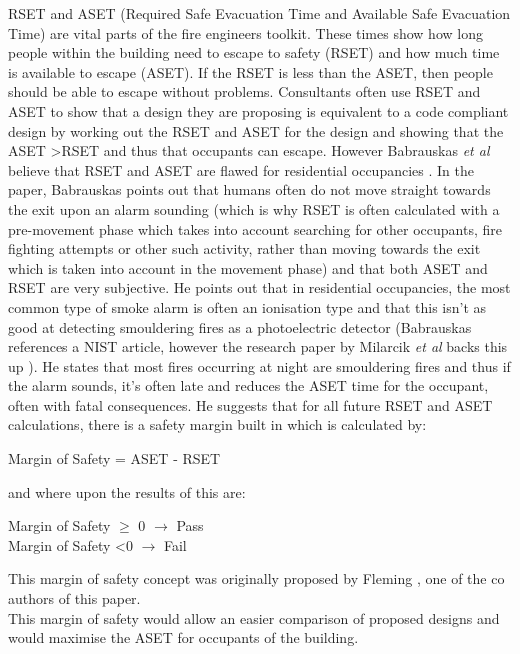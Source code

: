 \documentclass[table,a4paper,oneside]{book}
\begin{document}
RSET and ASET (Required Safe Evacuation Time and Available Safe Evacuation Time) are vital parts of the fire engineers toolkit. These times show how long people within the building need to escape to safety (RSET) and how much time is available to escape (ASET). If the RSET is less than the ASET, then people should be able to escape without problems. Consultants often use RSET and ASET to show that a design they are proposing is equivalent to a code compliant design by working out the RSET and ASET for the design and showing that the ASET \textgreater RSET and thus that occupants can escape. However Babrauskas \textit{et al} believe that RSET and ASET are flawed for residential occupancies \citep{Babrauskas2010}. In the paper, Babrauskas points out that humans often do not move straight towards the exit upon an alarm sounding (which is why RSET is often calculated with a pre-movement phase which takes into account searching for other occupants, fire fighting attempts or other such activity, rather than moving towards the exit which is taken into account in the movement phase) and that both ASET and RSET are very subjective. He points out that in residential occupancies, the most common type of smoke alarm is often an ionisation type and that this isn't as good at detecting smouldering fires as a photoelectric detector (Babrauskas references a NIST article, however the research paper by Milarcik \textit{et al} backs this up \citep{Milarcik2008}). He states that most fires occurring at night are smouldering fires and thus if the alarm sounds, it's often late and reduces the ASET time for the occupant, often with fatal consequences. He suggests that for all future RSET and ASET calculations, there is a safety margin built in which is calculated by:
\begin{center}
Margin of Safety = ASET - RSET
\end{center}
and where upon the results of this are:
\begin{center}
Margin of Safety $\geq$ 0 $\rightarrow$ Pass
\\
Margin of Safety \textless 0 $\rightarrow$ Fail
\end{center}
This margin of safety concept was originally proposed by Fleming \citep{Fleming2000}, one of the co authors of this paper.
\\
This margin of safety would allow an easier comparison of proposed designs and would maximise the ASET for occupants of the building.
\end{document}
